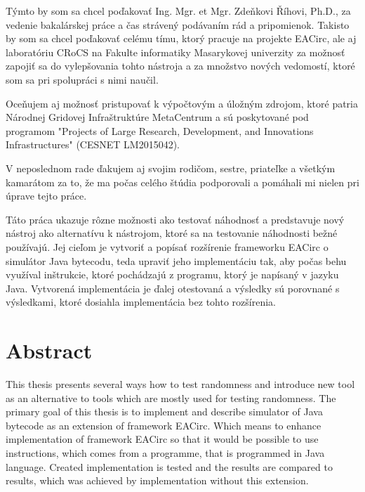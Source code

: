 \documentclass[12pt,twoside]{fithesis2}
\renewcommand{\_}{\leavevmode \kern0.0em\vbox{\hrule width0.4em}}
\begin{document}
\FrontMatter
\ThesisTitlePage


\begin{ThesisDeclaration}
\DeclarationText
\AdvisorName
\end{ThesisDeclaration}


\begin{ThesisThanks}
Týmto by som sa chcel poďakovať Ing. Mgr. et Mgr. Zdeňkovi Říhovi, Ph.D., za vedenie bakalárskej práce a čas strávený podávaním rád a pripomienok. Takisto by som sa chcel poďakovať celému tímu, ktorý pracuje na projekte EACirc, ale aj laboratóriu CRoCS na Fakulte informatiky Masarykovej univerzity za možnosť zapojiť sa do vylepšovania tohto nástroja a za množstvo nových vedomostí, ktoré som sa pri spolupráci s nimi naučil. 

Oceňujem aj možnosť pristupovať k výpočtovým a úložným zdrojom, ktoré patria Národnej Gridovej Infraštruktúre MetaCentrum a sú poskytované pod programom "Projects of Large Research, Development, and Innovations Infrastructures" (CESNET LM2015042).

V neposlednom rade ďakujem aj svojim rodičom, sestre, priateľke a všetkým kamarátom za to, že ma počas celého štúdia podporovali a pomáhali mi nielen pri úprave tejto práce.

\end{ThesisThanks}


\begin{ThesisAbstract}
Táto práca ukazuje rôzne možnosti ako testovať náhodnosť a predstavuje nový nástroj ako alternatívu k nástrojom, ktoré sa na testovanie náhodnosti bežné používajú. Jej cieľom je vytvoriť a popísať rozšírenie frameworku EACirc o simulátor Java bytecodu, teda upraviť jeho implementáciu tak, aby počas behu využíval inštrukcie, ktoré pochádzajú z programu, ktorý je napísaný v jazyku Java. Vytvorená implementácia je ďalej otestovaná a výsledky sú porovnané s výsledkami, ktoré dosiahla implementácia bez tohto rozšírenia.  
\end{ThesisAbstract}


\chapter*{Abstract}
This thesis presents several ways how to test randomness and introduce new tool as an alternative to tools which are mostly used for testing randomness.  The primary goal of this thesis is to implement and describe simulator of Java bytecode as an extension of framework EACirc. Which means to enhance implementation of framework EACirc so that it would be possible to use instructions, which comes from a programme, that is programmed in Java language.  Created implementation is tested and the results are compared to results, which was achieved by implementation without this extension.
\end{document}
